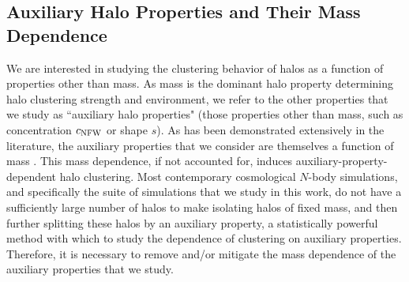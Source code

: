 \documentclass[usenatbib]{mnras}
\begin{document}
\subsection{Auxiliary Halo Properties and Their Mass Dependence}
\label{subsection:properties}

We are interested in studying the clustering behavior of halos as a function of 
properties other than mass. As mass is the dominant halo property determining halo
clustering strength and environment, we refer to the other properties that we study as 
``auxiliary halo properties" (those properties other than mass, such as concentration 
$c_{\rm NFW}$ or shape $s$). As has been demonstrated extensively in the literature, 
the auxiliary properties that we consider are themselves 
a function of mass \citep[e.g.,][and many others]{bullock_etal02,allgood_etal06, duffy_etal08, despali_etal16}. 
This mass dependence, if not accounted for, induces auxiliary-property-dependent halo clustering. 
Most contemporary cosmological $N$-body simulations, and specifically the suite of simulations 
that we study in this work, do not have a sufficiently large number of halos to make isolating halos 
of fixed mass, and then further splitting these halos by an auxiliary property, a statistically 
powerful method with which to study the dependence of clustering on auxiliary properties. 
Therefore, it is necessary to remove and/or mitigate the mass dependence of the auxiliary 
properties that we study. 
\end{document}
